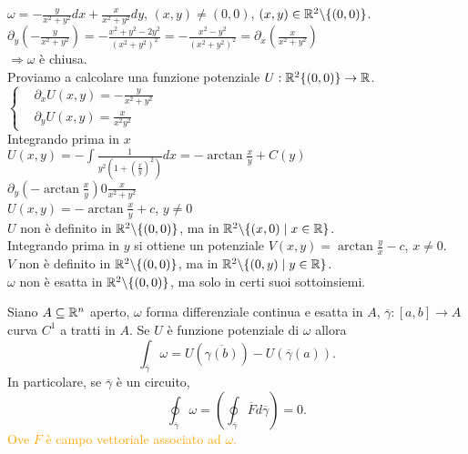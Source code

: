 \begin{exbar}
\begin{example}
	$\omega = - \frac{y}{x^2+y^2}dx+\frac{x}{x^2+y^2}dy$, $(x,y)\neq(0,0)$, $(x,y)\in \mathbb{R}^2\backslash\{(0,0)\}$.\\
	$\partial_y\left( -\frac{y}{x^2+y^2} \right)=-\frac{x^2+y^2-2y^2}{(x^2+y^2)^2}=-\frac{x^2-y^2}{(x^2+y^2)^2}=\partial_x\left( \frac{x}{x^2+y^2} \right)$\\
	$\Rightarrow \omega$ è chiusa.\\
	Proviamo a calcolare una funzione potenziale $U:\mathbb{R}^2\{(0,0)\}\rightarrow\mathbb{R}$.\\
	$\begin{cases}
		&\partial_xU(x,y)=-\frac{y}{x^2+y^2}\\
		&\partial_yU(x,y)=\frac{x}{x^2y^2}
	\end{cases}$\\
	Integrando prima in $x$\\
	$U(x,y)=-\int\frac{1}{y^2\left(1+ \left(\frac{x}{y}\right)^2 \right)}dx=-\arctan \frac{x}{y} + C(y)$\\
	$\partial_y(-\arctan \frac{x}{y})0\frac{x}{x^2+y^2}$\\
	$U(x,y)=-\arctan \frac{x}{y}+c$, $y \neq 0$\\
	$U$ non è definito in $\mathbb{R}^2 \backslash\{(0,0)\}$, ma in $\mathbb{R}^2\backslash \{(x,0)\mid x \in\mathbb{R}\}$.\\
	Integrando prima in $y$ si ottiene un potenziale $V(x,y)=\arctan \frac{y}{x}-c$, $x\neq 0$.\\
	$V$ non è definito in $\mathbb{R}^2\backslash\{(0,0)\}$, ma in $\mathbb{R}^2\backslash\{(0,y)\mid y \in \mathbb{R}\}$.\\
	$\omega$ non è esatta in $\mathbb{R}^2\backslash\{(0,0)\}$, ma solo in certi suoi sottoinsiemi.
\end{example}
\end{exbar}


\begin{theorem}
	
	\label{th: pag 475}
	Siano $A \subseteq \mathbb{R}^n$ aperto, $\omega$ forma differenziale continua e esatta in $A$, $\overline{\gamma}:[a,b]\rightarrow A$ curva $C^1$ a tratti in $A$. Se $U$ è funzione potenziale di $\omega$ allora
	\begin{equation*}
		\int_{\overline{\gamma}}\omega =U(\overline{\gamma (b)})-U(\overline{\gamma}(a)).
	\end{equation*}
	In particolare, se $\overline{\gamma}$ è un circuito,
	\begin{equation*}
		\oint_{\overline{\gamma}}\omega = \left( \oint_{\overline{\gamma}}\overline{F} d\overline{\gamma} \right)=0.
	\end{equation*}
	\textcolor{orange}{Ove $\overline{F}$ è campo vettoriale associato ad $\omega$.}
\end{theorem}


